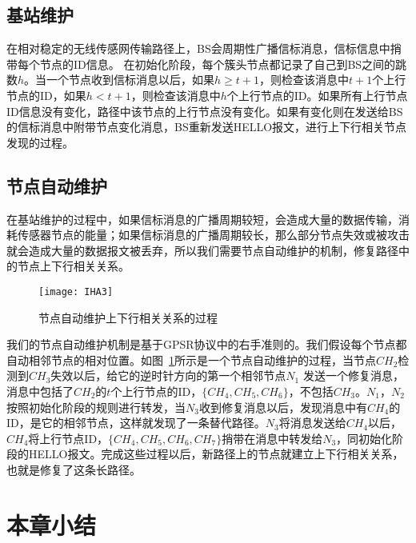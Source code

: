\subsection{基站维护}
在相对稳定的无线传感网传输路径上，BS会周期性广播信标消息，信标信息中捎带每个节点的ID信息。
在初始化阶段，每个簇头节点都记录了自己到BS之间的跳数$h$。当一个节点收到信标消息以后，如果$h\geq t+1$，则检查该消息中$t+1$个上行节点的ID，如果$h< t+1$，则检查该消息中$h$个上行节点的ID。如果所有上行节点ID信息没有变化，路径中该节点的上行节点没有变化。如果有变化则在发送给BS的信标消息中附带节点变化消息，BS重新发送HELLO报文，进行上下行相关节点发现的过程。
\subsection{节点自动维护}
在基站维护的过程中，如果信标消息的广播周期较短，会造成大量的数据传输，消耗传感器节点的能量；如果信标消息的广播周期较长，那么部分节点失效或被攻击就会造成大量的数据报文被丢弃，所以我们需要节点自动维护的机制，修复路径中的节点上下行相关关系。
\begin{figure}[htbp]
  \centering
  \texttt{[image: IHA3]}
  \caption{节点自动维护上下行相关关系的过程}
  \label{fig:IHA3}
\end{figure}

我们的节点自动维护机制是基于GPSR协议\cite{karp2000gpsr}中的右手准则的。我们假设每个节点都自动相邻节点的相对位置。如图~\ref{fig:IHA3}所示是一个节点自动维护的过程，当节点$CH_2$检测到$CH_3$失效以后，给它的逆时针方向的第一个相邻节点$N_1$ 发送一个修复消息，消息中包括了$CH_2$的$t$个上行节点的ID，$\{CH_4,CH_5,CH_6\}$，不包括$CH_3$。$N_1$，$N_2$按照初始化阶段的规则进行转发，当$N_3$收到修复消息以后，发现消息中有$CH_4$的ID，是它的相邻节点，这样就发现了一条替代路径。$N_3$将消息发送给$CH_4$以后，$CH_4$将上行节点ID，$\{CH_4,CH_5,CH_6,CH_7\}$捎带在消息中转发给$N_3$，同初始化阶段的HELLO报文。完成这些过程以后，新路径上的节点就建立上下行相关关系，也就是修复了这条长路径。

\section{本章小结}
